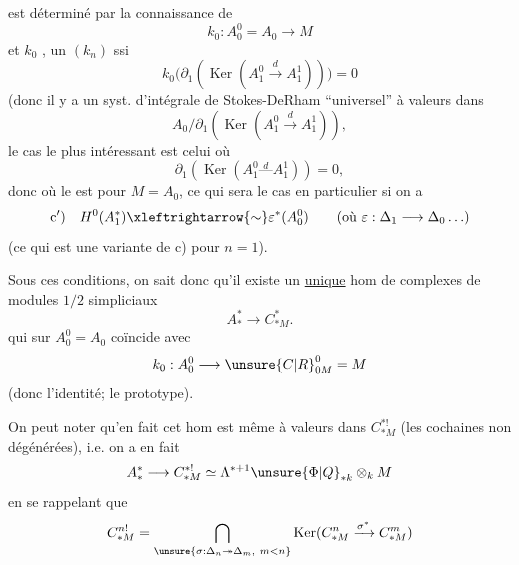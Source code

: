 
est déterminé par la connaissance de
\[
k_0:A_0^0=A_0\longrightarrow M
\]
et $k_0$ , un $(k_n)$  ssi
\[
k_0\bigl(\partial_1(\operatorname{Ker}(A_1^0\xrightarrow{d}A_1^1))\bigr)=0
\]
(donc il y a un syst. d'intégrale de Stokes-DeRham ``universel'' à valeurs dans
\[
A_0/\partial_1(\operatorname{Ker}(A_1^0\xrightarrow{d}A_1^1)),
\]
le cas le plus intéressant est celui où
\[
\partial_1(\operatorname{Ker}(A_1^0\overset{d}{\text{---}}A_1^1))=0,
\]
donc où le  est pour $M=A_0$, ce qui sera le cas en particulier si on a
\[
\mathrm{c}')\quad H^0(A_1^*)\xleftrightarrow{\sim}\varepsilon^*(A_0^0)
\qquad(\text{où }\varepsilon:\Delta_1\longrightarrow\Delta_0\ldots)
\]
(ce qui est une variante de c) pour $n=1$).


Sous ces conditions, on sait donc qu'il existe un \uline{unique} hom de complexes de modules $1/2$ simpliciaux
\[
A_*^*\longrightarrow C_{*M}^*.
\]
qui sur $A_0^0=A_0$ coïncide avec
\[
k_0:A_0^0\longrightarrow \unsure{C|R}_{0M}^0=M
\]
(donc l'identité; le  prototype).

On peut noter qu'en fait cet hom est même à valeurs dans $C_{*M}^{*!}$ (les cochaines non dégénérées), i.e. on a en fait
\[
A_*^*\longrightarrow C_{*M}^{*!}\simeq
\Lambda^{*+1}\unsure{\Phi|Q}_{*k}\otimes_k M
\]
en se rappelant que
\[
C_{*M}^{n!}=
\bigcap_{\unsure{\sigma:\Delta_n\twoheadrightarrow\Delta_m,\ m<n}}
\operatorname{Ker}(C_{*M}^{n}\xrightarrow{\sigma^*}C_{*M}^{m})
\]
